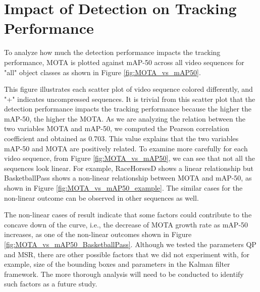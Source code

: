 \section{Impact of Detection on Tracking Performance}
\label{sec:results/section_c}

To analyze how much the detection performance impacts the tracking performance, MOTA is plotted against mAP-50 across all video sequences for "all" object classes as shown in Figure \ref{fig:MOTA_vs_mAP50}.

This figure illustrates each scatter plot of video sequence colored differently, and "+" indicates uncompressed sequences. It is trivial from this scatter plot that the detection performance impacts the tracking performance because the higher the mAP-50, the higher the MOTA. As we are analyzing the relation between the two variables MOTA and mAP-50, we computed the Pearson correlation coefficient and obtained as 0.703. This value explains that the two variables mAP-50 and MOTA are positively related. To examine more carefully for each video sequence, from Figure \ref{fig:MOTA_vs_mAP50}, we can see that not all the sequences look linear. For example, RaceHorsesD shows a linear relationship but BasketballPass shows a non-linear relationship between MOTA and mAP-50, as shown in Figure \ref{fig:MOTA_vs_mAP50_example}. The similar cases for the non-linear outcome can be observed in other sequences as well. 

The non-linear cases of result indicate that some factors could contribute to the concave down of the curve, i.e., the decrease of MOTA growth rate as mAP-50 increases, as one of the non-linear outcomes shown in Figure \ref{fig:MOTA_vs_mAP50_BasketballPass}. Although we tested the parameters QP and MSR, there are other possible factors that we did not experiment with, for example, size of the bounding boxes and parameters in the Kalman filter framework. The more thorough analysis will need to be conducted to identify such factors as a future study.